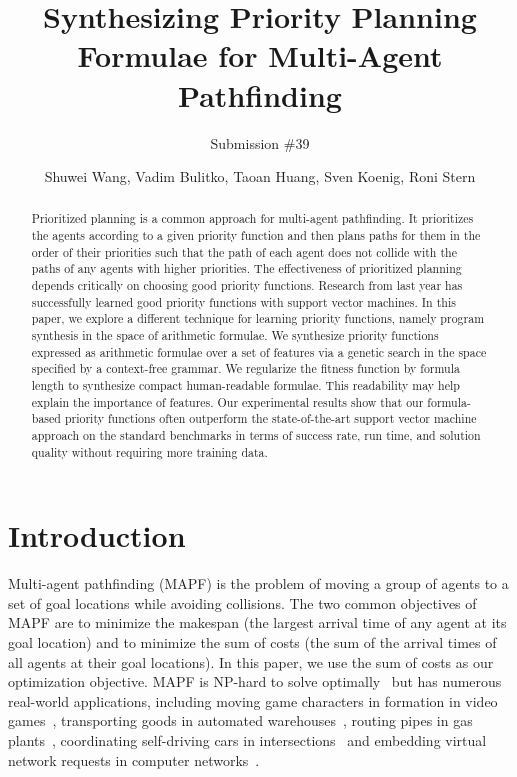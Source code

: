 \documentclass[letterpaper]{article}
\title{Synthesizing Priority Planning Formulae for Multi-Agent Pathfinding}
\author{
Submission \#39
}
\author{
Shuwei Wang, Vadim Bulitko, Taoan Huang, Sven Koenig, Roni Stern
}
\begin{document}
\maketitle

\begin{abstract}

Prioritized planning is a common approach for multi-agent pathfinding. It prioritizes the agents according to a given priority function and then plans paths for them in the order of their priorities such that the path of each agent does not collide with the paths of any agents with higher priorities. The effectiveness of prioritized planning depends critically on choosing good priority functions. Research from last year has successfully learned good priority functions with support vector machines. In this paper, we explore a different technique for learning priority functions, namely program synthesis in the space of arithmetic formulae. We synthesize priority functions expressed as arithmetic formulae over a set of features via a genetic search in the space specified by a context-free grammar. We regularize the fitness function by formula length to synthesize compact human-readable formulae. This readability may help explain the importance of features. Our experimental results show that our formula-based priority functions often outperform the state-of-the-art support vector machine approach on the standard benchmarks in terms of success rate, run time, and solution quality without requiring more training data.

\end{abstract}

\section{Introduction}
\label{sec:introduction}

Multi-agent pathfinding (MAPF) is the problem of moving a group of agents to a set of goal locations while avoiding collisions. The two common objectives of MAPF are to minimize the makespan (the largest arrival time of any agent at its goal location) and to minimize the sum of costs (the sum of the arrival times of all agents at their goal locations). In this paper, we use the sum of costs as our optimization objective. MAPF is NP-hard to solve optimally~\citep{yu2013structure, surynek2010optimization, ma2016multi} but has numerous real-world applications, including moving game characters in formation in video games~\citep{ma2017feasibility}, transporting goods in automated warehouses~\cite{wurman2008coordinating}, routing pipes in gas plants~\cite{Koen20r}, coordinating self-driving cars in intersections~\cite{Koen23e} and embedding virtual network requests in computer networks~\cite{Koen23g}.
\end{document}
